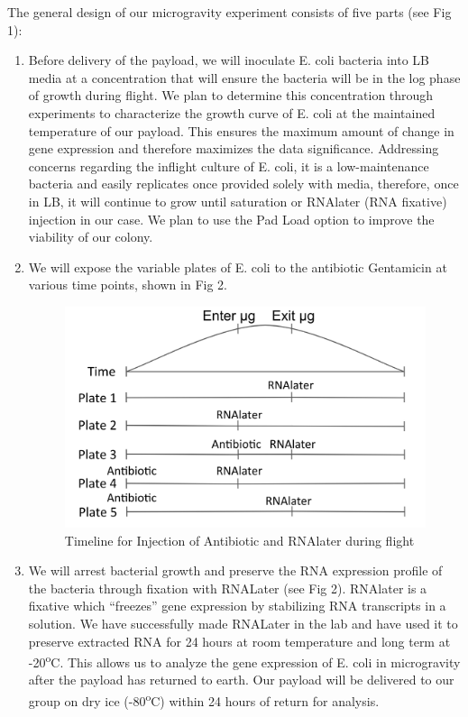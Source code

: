 \documentclass[twocolumn]{article}
\begin{document}
The general design of our microgravity experiment consists of five parts (see Fig 1): 

\begin{enumerate}
    \item Before delivery of the payload, we will inoculate E. coli bacteria into LB media at a concentration that will ensure the bacteria will be in the log phase of growth during flight. We plan to determine this concentration through experiments to characterize the growth curve of E. coli at the maintained temperature of our payload. This ensures the maximum amount of change in gene expression and therefore maximizes the data significance. Addressing concerns regarding the inflight culture of E. coli, it is a low-maintenance bacteria and easily replicates once provided solely with media, therefore, once in LB, it will continue to grow until saturation or RNAlater (RNA fixative) injection in our case. We plan to use the Pad Load option to improve the viability of our colony.
    
    \item We will expose the variable plates of E. coli to the antibiotic Gentamicin at various time points, shown in Fig 2.\\
    \vspace{-5mm}
    \begin{figure}[h]
        \centering
        \includegraphics[scale = 0.28]{images/timeline2.png}
        \caption{Timeline for Injection of Antibiotic and RNAlater during flight}
        \label{fig:my_label}
    \end{figure}
    
    \item We will arrest bacterial growth and preserve the RNA expression profile of the bacteria through fixation with RNALater (see Fig 2). 
    RNAlater is a fixative which “freezes” gene expression by stabilizing RNA transcripts in a solution. We have successfully made RNALater in the lab and have used it to preserve extracted RNA for 24 hours at room temperature and long term at -20\textsuperscript{o}C. This allows us to analyze the gene expression of E. coli in microgravity after the payload has returned to earth. Our payload will be delivered to our group on dry ice (-80\textsuperscript{o}C) within 24 hours of return for analysis.
    

\end{enumerate}
\end{document}
